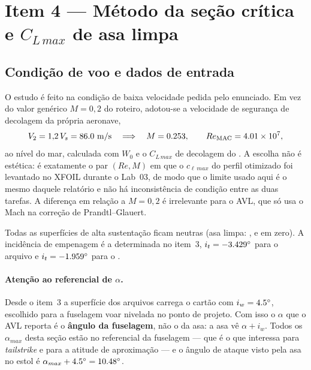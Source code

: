 


\section{Item 4 --- Método da seção crítica e $C_{L\,max}$ de asa limpa}
\label{sec:secao-critica}

\subsection{Condição de voo e dados de entrada}

O estudo é feito na condição de baixa velocidade pedida pelo enunciado. Em vez
do valor genérico $M=0{,}2$ do roteiro, adotou-se a velocidade de segurança de
decolagem da própria aeronave,
\begin{equation}
  V_2 = 1{,}2\,V_s = 86.0~\mathrm{m/s}
  \quad\Longrightarrow\quad
  M = 0.253,
  \qquad
  Re_{\mathrm{MAC}} = 4.01 \times 10^{7},
\end{equation}
ao nível do mar, calculada com $W_0$ e o $C_{L\,max}$ de decolagem do
. A escolha não é estética: é exatamente o par $(Re, M)$ em que
o $c_{\ell\,max}$ do perfil otimizado foi levantado no XFOIL durante o Lab~03,
de modo que o limite usado aqui é o mesmo daquele relatório e não há
inconsistência de condição entre as duas tarefas. A diferença em relação a
$M=0{,}2$ é irrelevante para o AVL, que só usa o Mach na correção de
Prandtl--Glauert.

Todas as superfícies de alta sustentação ficam neutras (asa limpa: ,
 e  em zero). A incidência de empenagem é a determinada
no item~3, $i_t = -3.429^\circ$ para o arquivo  e
$i_t = -1.959^\circ$ para o .

\paragraph{Atenção ao referencial de $\alpha$.}
Desde o item~3 a superfície  dos arquivos  carrega o
cartão  com $i_w = 4.5^\circ$, escolhido para a fuselagem voar
nivelada no ponto de projeto. Com isso o $\alpha$ que o AVL reporta é o
\textbf{ângulo da fuselagem}, não o da asa: a asa vê $\alpha + i_w$. Todos os
$\alpha_{max}$ desta seção estão no referencial da fuselagem --- que é o que
interessa para \emph{tailstrike} e para a atitude de aproximação --- e o ângulo
de ataque visto pela asa no estol é
$\alpha_{max} + 4.5^\circ = 10.48^\circ$.

